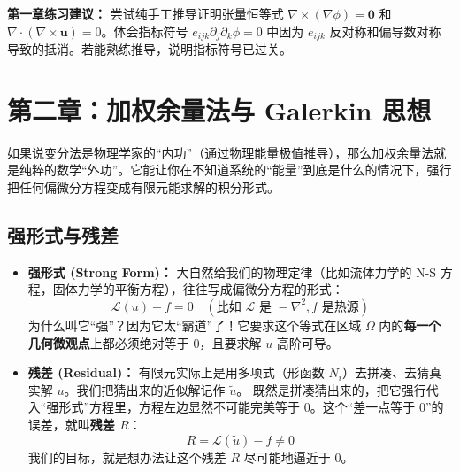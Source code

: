 \documentclass[11pt, a4paper, UTF8]{ctexart}
\begin{document}
\textbf{第一章练习建议：}
尝试纯手工推导证明张量恒等式 $\nabla \times (\nabla \phi) = \bm{0}$ 和 $\nabla \cdot (\nabla \times \bm{u}) = 0$。体会指标符号 $e_{ijk} \partial_j \partial_k \phi = 0$ 中因为 $e_{ijk}$ 反对称和偏导数对称导致的抵消。若能熟练推导，说明指标符号已过关。

\section{第二章：加权余量法与 Galerkin 思想}
如果说变分法是物理学家的“内功”（通过物理能量极值推导），那么加权余量法就是纯粹的数学“外功”。它能让你在不知道系统的“能量”到底是什么的情况下，强行把任何偏微分方程变成有限元能求解的积分形式。

\subsection{强形式与残差}
\begin{itemize}
    \item \textbf{强形式 (Strong Form)：}
    大自然给我们的物理定律（比如流体力学的 N-S 方程，固体力学的平衡方程），往往写成偏微分方程的形式：
    \[ \mathcal{L}(u) - f = 0 \quad (\text{比如 } \mathcal{L} \text{ 是 } -\nabla^2, f \text{ 是热源}) \]
    为什么叫它“强”？因为它太“霸道”了！它要求这个等式在区域 $\Omega$ 内的\textbf{每一个几何微观点}上都必须绝对等于 0，且要求解 $u$ 高阶可导。
    
    \item \textbf{残差 (Residual)：}
    有限元实际上是用多项式（形函数 $N_i$）去拼凑、去猜真实解 $u$。我们把猜出来的近似解记作 $\tilde{u}$。
    既然是拼凑猜出来的，把它强行代入“强形式”方程里，方程左边显然不可能完美等于 0。这个“差一点等于 0”的误差，就叫\textbf{残差 $R$}：
    \[ R = \mathcal{L}(\tilde{u}) - f \neq 0 \]
    我们的目标，就是想办法让这个残差 $R$ 尽可能地逼近于 0。
\end{itemize}
\end{document}

